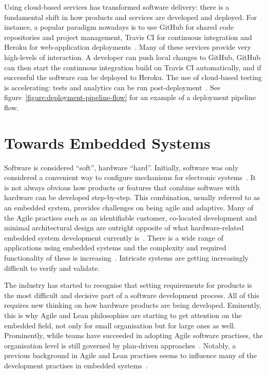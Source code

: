 \documentclass[english]{tktltiki2}
\begin{document}
Using cloud-based services has transformed software delivery: there is a fundamental shift in how products and services are developed and deployed. For instance, a popular paradigm nowadays is to use GitHub for shared code repositories and project management, Travis CI for continuous integration and Heroku for web-application deployments~\cite{GitHub, Travis, Heroku}. Many of these services provide very high-levels of interaction. A developer can push local changes to GitHub, GitHub can then start the continuous integration build on Travis CI automatically, and if successful the software can be deployed to Heroku. The use of cloud-based testing is accelerating: tests and analytics can be run post-deployment~\cite{RK14}. See figure~\ref{figure:deployment-pipeline-flow} for an example of a deployment pipeline flow.


\section{Towards Embedded Systems}

Software is considered “soft”, hardware “hard”. Initially, software was only considered a convenient way to configure mechanisms for electronic systems~\cite{BE12}. It is not always obvious how products or features that combine software with hardware can be developed step-by-step. This combination, usually referred to as an embedded system, provides challenges on being agile and adaptive. Many of the Agile practises such as an identifiable customer, co-located development and minimal architectural design are outright opposite of what hardware-related embedded system development currently is~\cite{RA03}. There is a wide range of applications using embedded systems and the complexity and required functionality of these is increasing~\cite{KRM13, EHS14}. Intricate systems are getting increasingly difficult to verify and validate.

The industry has started to recognise that setting requirements for products is the most difficult and decisive part of a software development process. All of this requires new thinking on how hardware products are being developed. Eminently, this is why Agile and Lean philosophies are starting to get attention on the embedded field, not only for small organisation but for large ones as well. Prominently, while teams have succeeded in adopting Agile software practises, the organisation level is still governed by plan-driven approaches~\cite{EB12, EHS14}. Notably, a previous background in Agile and Lean practises seems to influence many of the development practises in embedded systems~\cite{KRM13}.
\end{document}
